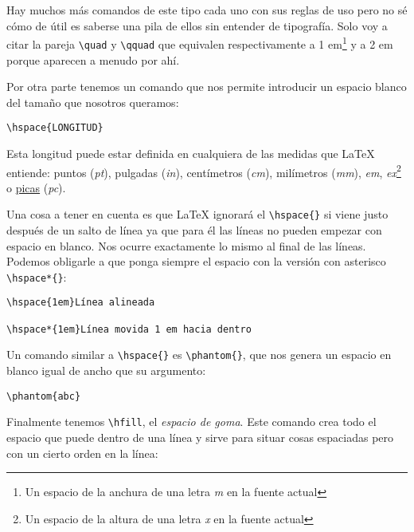 Hay muchos más comandos de este tipo cada uno con sus reglas de uso pero
no sé cómo de útil es saberse una pila de ellos sin entender de
tipografía. Solo voy a citar la pareja \lstinline!\quad! y
\lstinline!\qquad! que equivalen respectivamente a 1 em\footnote{Un
  espacio de la anchura de una letra \emph{m} en la fuente actual} y a 2
em porque aparecen a menudo por ahí.

Por otra parte tenemos un comando que nos permite introducir un espacio
blanco del tamaño que nosotros queramos:

\begin{lstlisting}[language={[latex]tex}]
\hspace{LONGITUD}
\end{lstlisting}

Esta longitud puede estar definida en cualquiera de las medidas que
LaTeX entiende: puntos (\emph{pt}), pulgadas (\emph{in}), centímetros
(\emph{cm}), milímetros (\emph{mm}), \emph{em}, \emph{ex}\footnote{Un
espacio de la altura de una letra \emph{x} en la fuente actual} o \href{https://en.wikipedia.org/wiki/Pica\_(typography)}{picas} (\emph{pc}).

Una cosa a tener en cuenta es que LaTeX ignorará el
\lstinline!\hspace{}! si viene justo después de un salto de línea ya que
para él las líneas no pueden empezar con espacio en blanco. Nos ocurre
exactamente lo mismo al final de las líneas. Podemos obligarle a que
ponga siempre el espacio con la versión con asterisco
\lstinline!\hspace*{}!:

\begin{lstlisting}[language={[latex]tex}]
% Diferencia entre \hspace y \hspace*
\hspace{1em}Línea alineada

\hspace*{1em}Línea movida 1 em hacia dentro
\end{lstlisting}

Un comando similar a \lstinline!\hspace{}! es \lstinline!\phantom{}!,
que nos genera un espacio en blanco igual de ancho que su argumento:

\begin{lstlisting}[language={[latex]tex}]
% Hueco del tamaño de abc
\phantom{abc}
\end{lstlisting}

Finalmente tenemos \lstinline!\hfill!, el \emph{espacio de goma}. Este
comando crea todo el espacio que puede dentro de una línea y sirve para
situar cosas espaciadas pero con un cierto orden en la línea:


